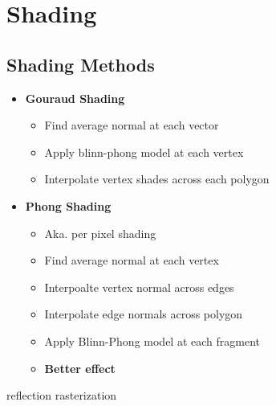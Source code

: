 \chapter{Shading}

\section{Shading Methods}

  \begin{itemize}
    \item \textbf{Gouraud Shading}
    \begin{itemize}
      \item Find average normal at each vector
      \item Apply blinn-phong model at each vertex
      \item Interpolate vertex shades across each polygon
    \end{itemize}

    \item \textbf{Phong Shading}
    \begin{itemize}
      \item Aka. per pixel shading
      \item Find average normal at each vertex
      \item Interpoalte vertex normal across edges
      \item Interpolate edge normals across polygon
      \item Apply Blinn-Phong model at each fragment
      \item \textbf{Better effect}
    \end{itemize}
  \end{itemize}

{reflection}
{rasterization}
